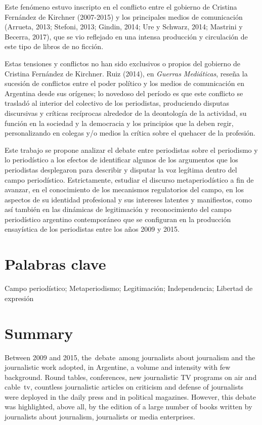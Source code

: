 Este fenómeno estuvo inscripto en el conflicto entre el gobierno de Cristina Fernández de Kirchner (2007-2015) y los principales medios de comunicación (Arrueta, 2013; Stefoni, 2013; Gindin, 2014; Ure y Schwarz, 2014; Mastrini y Becerra, 2017), que se vio reflejado en una intensa producción y circulación de este tipo de libros de no ficción.

Estas tensiones y conflictos no han sido exclusivos o propios del gobierno de Cristina Fernández de Kirchner. Ruiz (2014), en \emph{Guerras Mediáticas}, reseña la sucesión de conflictos entre el poder político y los medios de comunicación en Argentina desde sus orígenes; lo novedoso del período es que este conflicto se trasladó al interior del colectivo de los periodistas, produciendo disputas discursivas y críticas recíprocas alrededor de la deontología de la actividad, su función en la sociedad y la democracia y los principios que la deben regir, personalizando en colegas y/o medios la crítica sobre el quehacer de la profesión.

Este trabajo se propone analizar el debate entre periodistas sobre el periodismo y lo periodístico a los efectos de identificar algunos de los argumentos que los periodistas desplegaron para describir y disputar la voz legítima dentro del campo periodístico. Estrictamente, estudiar el discurso metaperiodístico a fin de avanzar, en el conocimiento de los mecanismos regulatorios del campo, en los aspectos de su identidad profesional y sus intereses latentes y manifiestos, como así también en las dinámicas de legitimación y reconocimiento del campo periodístico argentino contemporáneo que se configuran en la producción ensayística de los periodistas entre los años 2009 y 2015.

\chapter{Palabras clave}
Campo periodístico; Metaperiodismo; Legitimación; Independencia; Libertad de expresión

\chapter{Summary}

Between 2009 and 2015, the~debate~among journalists about journalism and the journalistic work adopted, in Argentine, a volume and intensity with few background. Round tables, conferences, new journalistic TV programs on air and cable~tv, countless journalistic articles on criticism and defense of journalists were deployed in the daily press and in political magazines. However, this debate was highlighted, above all, by the edition of a large number of books written by journalists about journalism, journalists or media enterprises.

